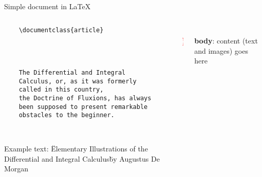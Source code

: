\copyrightTim

\begin{frame}[fragile, t]{Simple document in \LaTeX}
	\begin{columns}
        \begin{column}{0.5\textwidth}
	\begin{verbatim} 
	\documentclass{article}

		
	

	The Differential and Integral 
	Calculus, or, as it was formerly 
	called in this country, 
	the Doctrine of Fluxions, has always 
	been supposed to present remarkable 
	obstacles to the beginner.

	
	\end{verbatim}

	Example text: \"Elementary Illustrations of the Differential and Integral Calculus\" by Augustus De Morgan
\end{column}
\begin{column}{0.05\textwidth}
	\phantom{{\Huge \textcolor{red}{ \} } }}
	\\[2cm]
	{\Huge \textcolor{red}{ \} } }
	
\end{column}
\begin{column}{0.4\textwidth}
	\\[2cm]
	\textbf{body}: content (text and images) goes here
\end{column}
\end{columns}

\end{frame}
